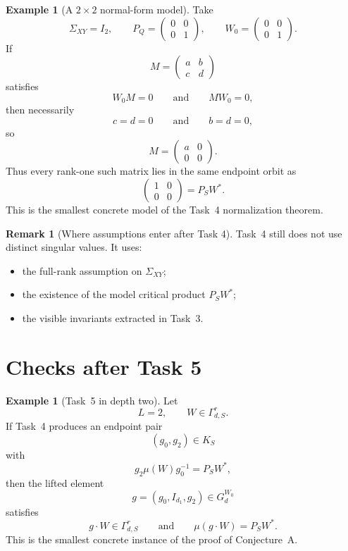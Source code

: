 \documentclass{article}
\theoremstyle{definition}
\newtheorem{remark}[theorem]{Remark}
\newtheorem{example}[theorem]{Example}
\begin{document}
\begin{example}[A $2\times 2$ normal-form model]
Take
\[
\Sigma_{XY}=I_2,
\qquad
P_Q=
\begin{pmatrix}
0&0\\
0&1
\end{pmatrix},
\qquad
W_0=
\begin{pmatrix}
0&0\\
0&1
\end{pmatrix}.
\]
If
\[
M=
\begin{pmatrix}
a&b\\
c&d
\end{pmatrix}
\]
satisfies
\[
W_0M=0
\qquad\text{and}\qquad
MW_0=0,
\]
then necessarily
\[
c=d=0
\qquad\text{and}\qquad
b=d=0,
\]
so
\[
M=
\begin{pmatrix}
a&0\\
0&0
\end{pmatrix}.
\]
Thus every rank-one such matrix lies in the same endpoint orbit as
\[
\begin{pmatrix}
1&0\\
0&0
\end{pmatrix}=P_SW^\ast.
\]
This is the smallest concrete model of the Task~4 normalization theorem.
\end{example}

\begin{remark}[Where assumptions enter after Task 4]
Task~4 still does not use distinct singular values. It uses:
\begin{itemize}
\item the full-rank assumption on $\Sigma_{XY}$;
\item the existence of the model critical product $P_SW^\ast$;
\item the visible invariants extracted in Task~3.
\end{itemize}
\end{remark}

\section{Checks after Task 5}

\begin{example}[Task~5 in depth two]
Let
\[
L=2,
\qquad
W\in \Gamma_{d,S}^r.
\]
If Task~4 produces an endpoint pair
\[
(g_0,g_2)\in K_S
\]
with
\[
g_2\mu(W)g_0^{-1}=P_SW^\ast,
\]
then the lifted element
\[
g=(g_0,I_{d_1},g_2)\in G_d^{W_0}
\]
satisfies
\[
g\cdot W\in \Gamma_{d,S}^r
\qquad\text{and}\qquad
\mu(g\cdot W)=P_SW^\ast.
\]
This is the smallest concrete instance of the proof of Conjecture~A.
\end{example}
\end{document}
